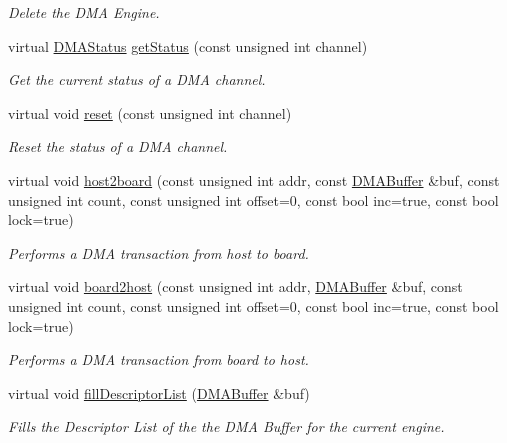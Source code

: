 \begin{CompactItemize}
\begin{CompactList}\small\item\em Delete the DMA Engine. \item\end{CompactList}\item 
virtual \hyperlink{classmprace_1_1DMAEngine_w3}{DMAStatus} \hyperlink{classmprace_1_1DMAEngineWG_a2}{get\-Status} (const unsigned int channel)
\begin{CompactList}\small\item\em Get the current status of a DMA channel. \item\end{CompactList}\item 
virtual void \hyperlink{classmprace_1_1DMAEngineWG_a3}{reset} (const unsigned int channel)
\begin{CompactList}\small\item\em Reset the status of a DMA channel. \item\end{CompactList}\item 
virtual void \hyperlink{classmprace_1_1DMAEngineWG_a4}{host2board} (const unsigned int addr, const \hyperlink{classmprace_1_1DMABuffer}{DMABuffer} \&buf, const unsigned int count, const unsigned int offset=0, const bool inc=true, const bool lock=true)
\begin{CompactList}\small\item\em Performs a DMA transaction from host to board. \item\end{CompactList}\item 
virtual void \hyperlink{classmprace_1_1DMAEngineWG_a5}{board2host} (const unsigned int addr, \hyperlink{classmprace_1_1DMABuffer}{DMABuffer} \&buf, const unsigned int count, const unsigned int offset=0, const bool inc=true, const bool lock=true)
\begin{CompactList}\small\item\em Performs a DMA transaction from board to host. \item\end{CompactList}\item 
virtual void \hyperlink{classmprace_1_1DMAEngineWG_a6}{fill\-Descriptor\-List} (\hyperlink{classmprace_1_1DMABuffer}{DMABuffer} \&buf)
\begin{CompactList}\small\item\em Fills the Descriptor List of the the DMA Buffer for the current engine. \item\end{CompactList}\item 

\end{CompactItemize}
